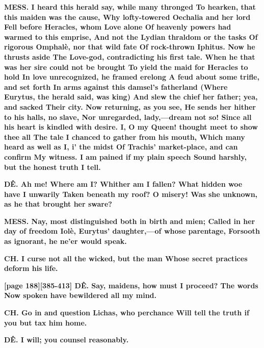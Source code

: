 \documentclass[11pt,letter]{book}
\begin{document}
\par \textbf{MESS. I heard this herald say, while many thronged To hearken, that this maiden was the cause, Why lofty-towered Oechalia and her lord Fell before Heracles, whom Love alone Of heavenly powers had warmed to this emprise, And not the Lydian thraldom or the tasks Of rigorous Omphalè, nor that wild fate Of rock-thrown Iphitus. Now he thrusts aside The Love-god, contradicting his first tale. When he that was her sire could not be brought To yield the maid for Heracles to hold In love unrecognized, he framed erelong A feud about some trifle, and set forth In arms against this damsel’s fatherland (Where Eurytus, the herald said, was king) And slew the chief her father; yea, and sacked Their city. Now returning, as you see, He sends her hither to his halls, no slave, Nor unregarded, lady,—dream not so! Since all his heart is kindled with desire. I, O my Queen! thought meet to show thee all The tale I chanced to gather from his mouth, Which many heard as well as I, i’ the midst Of Trachis’ market-place, and can confirm My witness. I am pained if my plain speech Sound harshly, but the honest truth I tell.}
\par 

\par \textbf{DÊ. Ah me! Where am I? Whither am I fallen? What hidden woe have I unwarily Taken beneath my roof? O misery! Was she unknown, as he that brought her sware?}
\par 

\par \textbf{MESS. Nay, most distinguished both in birth and mien; Called in her day of freedom Iolè, Eurytus’ daughter,—of whose parentage, Forsooth as ignorant, he ne’er would speak.}
\par 

\par \textbf{CH. I curse not all the wicked, but the man Whose secret practices deform his life.}
\par 

\par \textbf{[page 188][385-413] DÊ. Say, maidens, how must I proceed? The words Now spoken have bewildered all my mind.}
\par 

\par \textbf{CH. Go in and question Lichas, who perchance Will tell the truth if you but tax him home.}
\par 

\par \textbf{DÊ. I will; you counsel reasonably.}
\par 
\end{document}
